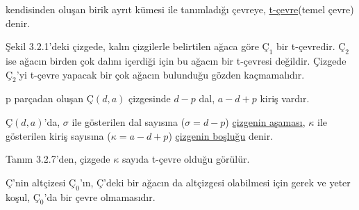 \documentclass[11pt]{amsbook}
\begin{document}

\begin{definition}
    
kendisinden oluşan birik ayrıt kümesi ile tanımladığı çevreye, \underline{t-çevre}(temel çevre) denir.
\end{definition}


Şekil 3.2.1'deki çizgede, kalın çizgilerle belirtilen ağaca göre $Ç_{1}$ bir t-çevredir. $Ç_{2}$ ise ağacın birden çok dalını içerdiği için bu ağacın bir t-çevresi değildir. Çizgede $Ç_{2}$'yi t-çevre yapacak bir çok ağacın bulunduğu gözden kaçmamalıdır.



\begin{theorem}
    p parçadan oluşan $Ç(d,a)$ çizgesinde $d-p$ dal, $a-d+p$ kiriş vardır.
\end{theorem}

\begin{definition}
    $Ç(d,a)$'da, $\sigma$ ile gösterilen dal sayısına ($\sigma = d - p$) \underline{çizgenin aşaması}, $\kappa$ ile gösterilen kiriş sayısına ($\kappa = a - d + p$) \underline{çizgenin boşluğu} denir.
\end{definition}

Tanım 3.2.7'den, çizgede $\kappa$ sayıda t-çevre olduğu görülür.

\begin{theorem}
    $Ç$'nin altçizesi $Ç_{0}$'ın, $Ç$'deki bir ağacın da altçizgesi olabilmesi için gerek ve yeter koşul, $Ç_{0}$'da bir çevre olmamasıdır. 
\end{theorem}
\end{document}
